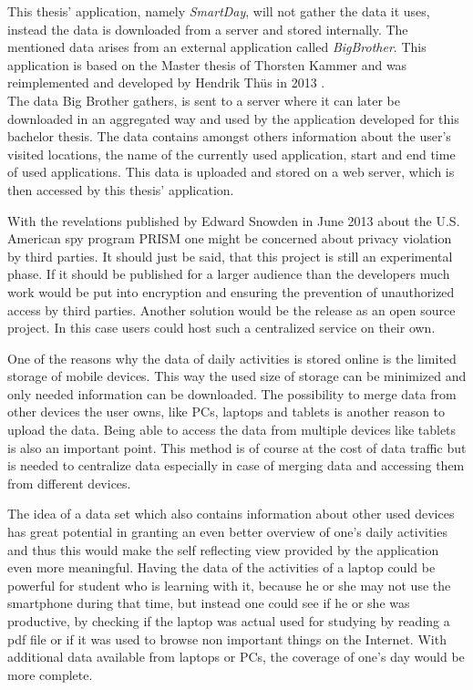 This  thesis' application, namely \emph{SmartDay}, will not gather the data it uses, instead the data is downloaded from a server and stored internally. The mentioned data arises from an external application called \emph{BigBrother}. This application is based on the Master thesis of Thorsten Kammer \cite{thorstensthesis} and was reimplemented and developed by Hendrik Th\"us in 2013 \cite{bigbrother}.\\
The data Big Brother gathers, is sent to a server where it can later be downloaded in an aggregated way and used by the application developed for this bachelor thesis. The data contains amongst others information about the user's visited locations, the name of the currently used application, start and end time of used applications. This data is uploaded and stored on a web server, which is then accessed by this thesis' application.

With  the revelations published by Edward Snowden in June 2013 about the U.S. American spy program PRISM one might be concerned about privacy violation by third parties. It should just be said, that this project is still an experimental phase. If it should be published for a larger audience than the developers much work would be put into encryption and ensuring the prevention of unauthorized access by third parties. Another solution would be the release as an open source project. In this case users could host such a centralized service on their own.

One  of the reasons why the data of daily activities is stored online is the limited storage of mobile devices. This way the used size of storage can be minimized and only needed information can be downloaded. The possibility to merge data from other devices the user owns, like PCs, laptops and tablets is another reason to upload the data. Being able to access the data from multiple devices like tablets is also an important point. This method is of course at the cost of data traffic but is needed to centralize data especially in case of merging data and accessing them from different devices.

The idea of a data set which also contains information about other used devices has great potential in granting an even better overview of one's daily activities and thus this would make the self reflecting view provided by the application even more meaningful. Having the data of the activities of a laptop could be powerful for student who is learning with it, because he or she may not use the smartphone during that time, but instead one could see if he or she was productive, by checking if the laptop was actual used for studying by reading a pdf file or if it was used to browse non important things on the Internet. With additional data available from laptops or PCs, the coverage of one's day would be more complete.
